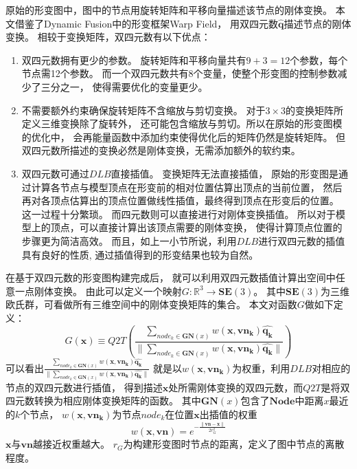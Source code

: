 原始的形变图中，图中的节点用旋转矩阵和平移向量描述该节点的刚体变换。
本文借鉴了Dynamic Fusion\cite{newcombe2015dynamicfusion}中的形变框架Warp Field，
用双四元数$\hat{\bm{q}}$描述节点的刚体变换。
相较于变换矩阵，双四元数有以下优点：
\begin{enumerate}
    \item   双四元数拥有更少的参数。
            旋转矩阵和平移向量共有$9+3=12$个参数，每个节点需12个参数。
            而一个双四元数共有8个变量，使整个形变图的控制参数减少了三分之一，
            使得需要优化的变量更少。
    \item   不需要额外约束确保旋转矩阵不含缩放与剪切变换。
            对于$3 \times 3$的变换矩阵所定义三维变换除了旋转外，
            还可能包含缩放与剪切。所以在原始的形变图模的优化中，
            会再能量函数中添加约束使得优化后的矩阵仍然是旋转矩阵。
            但双四元数所描述的变换必然是刚体变换，无需添加额外的软约束。
    \item   双四元数可通过$DLB$直接插值。
            变换矩阵无法直接插值，
            原始的形变图是通过计算各节点与模型顶点在形变前的相对位置估算出顶点的当前位置，
            然后再对各顶点估算出的顶点位置做线性插值，最终得到顶点在形变后的位置。
            这一过程十分繁琐。
            而四元数则可以直接进行对刚体变换插值。
            所以对于模型上的顶点，可以直接计算出该顶点需要的刚体变换，
            使得计算顶点位置的步骤更为简洁高效。
            而且，如上一小节所说，利用$DLB$进行双四元数的插值具有良好的性质,
            通过插值得到的形变结果也较为自然。
\end{enumerate}

在基于双四元数的形变图构建完成后，
就可以利用双四元数插值计算出空间中任意一点刚体变换。
由此可以定义一个映射$G:\mathbb{R}^3\rightarrow \bm{SE}(3)$。
其中$\bm{SE}(3)$为三维欧氏群，可看做所有三维空间中的刚体变换矩阵的集合。
本文对函数$G$做如下定义：
\begin{equation}
    G(\bm{x})\equiv Q2T(
        \frac
        {\sum_{node_k \in \bm{GN}(x)}w(\bm{x},\bm{vn_k}) \hat{\bm{q_k}}}
        {\| \sum_{node_k \in \bm{GN}(x)}w(\bm{x},\bm{vn_k}) \hat{\bm{q_k}} \|}
    )
\end{equation}
可以看出$\frac
        {\sum_{node_k \in \bm{GN}(x)}w(\bm{x},\bm{vn_k}) \hat{\bm{q_k}}}
        {\| \sum_{node_k \in \bm{GN}(x)}w(\bm{x},\bm{vn_k}) \hat{\bm{q_k}} \|}$
就是以$w(\bm{x},\bm{vn_k})$为权重，利用$DLB$对相应的节点的双四元数进行插值，
得到描述$\bm{x}$处所需刚体变换的双四元数，而$Q2T$是将双四元数转换为相应刚体变换矩阵的函数。
其中$\bm{GN}(x)$包含了$\bm{Node}$中距离$x$最近的$k$个节点，
$ w(\bm{x},\bm{vn_k})$为节点$node_k$在位置$\bm{x}$出插值的权重
\begin{equation}
    w(\bm{x},\bm{vn}) = e^{-\frac{\| \bm{vn} - \bm{x} \|}{2r_G^2}}
\end{equation}
$\bm{x}$与$\bm{vn}$越接近权重越大。
$r_G$为构建形变图时节点的距离，定义了图中节点的离散程度。

